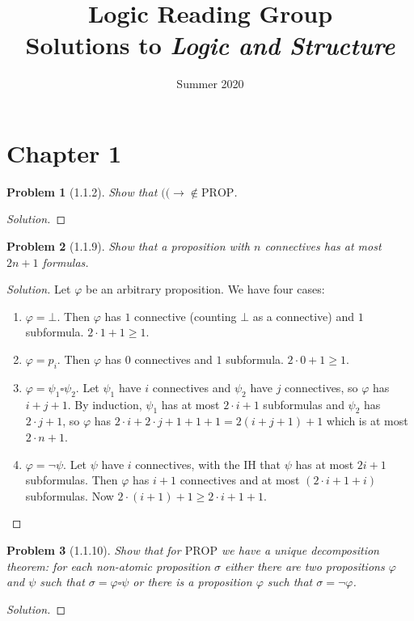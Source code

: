 \documentclass[letter]{article}
\title{Logic Reading Group\\Solutions to \textit{Logic and Structure}}
\date{Summer 2020}
\newtheorem{problem}{Problem}
\theoremstyle{definition}
\newenvironment{solution}
{\begin{proof}[Solution]}
        {\end{proof}}
\renewcommand{\phi}{\varphi}
\begin{document}
\maketitle

\newpage
\section{Chapter 1}
\begin{problem}[1.1.2]
    Show that $(( \to \not \in \textrm{PROP}$.
\end{problem}
\begin{solution}
\end{solution}

\begin{problem}[1.1.9] Show that a proposition with $n$ connectives has at most $2n + 1$ formulas.
\end{problem}
\begin{solution}
    Let $\phi$ be an arbitrary proposition. We have four cases:
    \begin{enumerate}
        \item $\phi = \bot$. Then $\phi$ has $1$ connective (counting $\bot$ as a connective) and $1$ subformula. $2 \cdot 1 + 1 \geq 1$.
        \item $\phi = p_i$. Then $\phi$ has $0$ connectives and $1$ subformula. $2 \cdot 0 + 1 \geq 1$.
        \item $\phi = \psi_1 \square \psi_2$. Let $\psi_1$ have $i$ connectives and $\psi_2$ have $j$ connectives, so $\phi$ has $i + j + 1$. By induction, $\psi_1$ has at most $2 \cdot i + 1$ subformulas and $\psi_2$ has $2 \cdot j + 1$, so $\phi$ has $2 \cdot i + 2 \cdot j + 1 + 1 + 1 = 2 (i + j + 1) + 1$ which is at most $2 \cdot n + 1$.
        \item $\phi = \neg \psi$. Let $\psi$ have $i$ connectives, with the IH that $\psi$ has at most $2 i + 1$ subformulas. Then $\phi$ has $i + 1$ connectives and at most $(2 \cdot i + 1 + i)$ subformulas. Now $2 \cdot (i + 1) + 1 \geq 2 \cdot i + 1 + 1$.
    \end{enumerate}
\end{solution}

\begin{problem}[1.1.10] Show that for $\textrm{PROP}$ we have a unique decomposition theorem: for each non-atomic proposition $\sigma$ either there are two propositions $\phi$ and $\psi$ such that $\sigma = \phi \square \psi$ or there is a proposition $\phi$ such that $\sigma = \neg \phi$.
\end{problem}
\begin{solution}
\end{solution}
\end{document}
